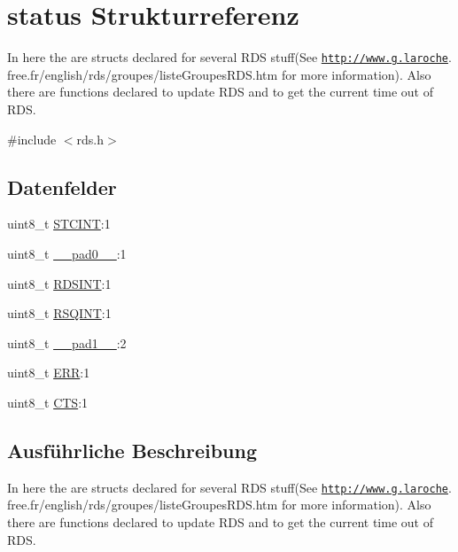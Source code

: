 \hypertarget{structstatus}{}\section{status Strukturreferenz}
\label{structstatus}


In here the are structs declared for several R\+D\+S stuff(See \href{http://www.g.laroche}{\tt http\+://www.\+g.\+laroche}. free.\+fr/english/rds/groupes/liste\+Groupes\+R\+D\+S.htm for more information). Also there are functions declared to update R\+D\+S and to get the current time out of R\+D\+S.  




{\ttfamily \#include $<$rds.\+h$>$}

\subsection*{Datenfelder}
\begin{DoxyCompactItemize}
\item 
uint8\+\_\+t \hyperlink{structstatus_a1026d3a63b328db2451abc49e0bd5a2c}{S\+T\+C\+I\+N\+T}\+:1
\item 
uint8\+\_\+t \hyperlink{structstatus_a8b4eebe79ded0459acec2f4950102ba3}{\+\_\+\+\_\+pad0\+\_\+\+\_\+}\+:1
\item 
uint8\+\_\+t \hyperlink{structstatus_a4fac7351844086822dbf634529f6cfbd}{R\+D\+S\+I\+N\+T}\+:1
\item 
uint8\+\_\+t \hyperlink{structstatus_a9637ec0bb6d40570ea68a1b96c5d561e}{R\+S\+Q\+I\+N\+T}\+:1
\item 
uint8\+\_\+t \hyperlink{structstatus_a77f12d2e278bd5c07712648ac0df5e08}{\+\_\+\+\_\+pad1\+\_\+\+\_\+}\+:2
\item 
uint8\+\_\+t \hyperlink{structstatus_afb74dff3cfacd68c02883e5282ef2f59}{E\+R\+R}\+:1
\item 
uint8\+\_\+t \hyperlink{structstatus_a7f1760325354f291b9a0190e7e355ca8}{C\+T\+S}\+:1
\end{DoxyCompactItemize}


\subsection{Ausführliche Beschreibung}
In here the are structs declared for several R\+D\+S stuff(See \href{http://www.g.laroche}{\tt http\+://www.\+g.\+laroche}. free.\+fr/english/rds/groupes/liste\+Groupes\+R\+D\+S.htm for more information). Also there are functions declared to update R\+D\+S and to get the current time out of R\+D\+S. 

